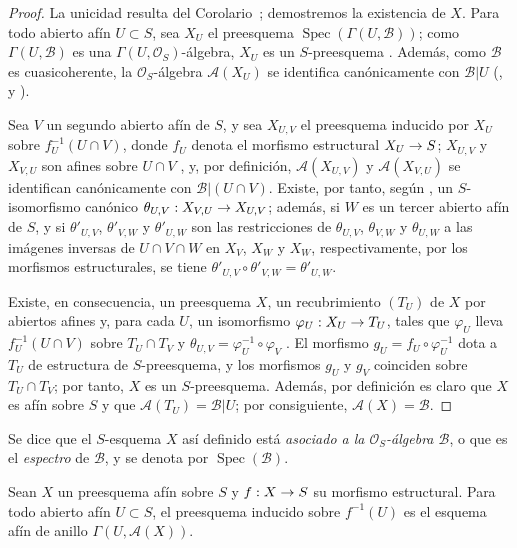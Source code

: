 \documentclass[oneside,10pt]{amsart}
\makeatletter
\newcommand{\ega@arrow}[2]{\mathchoice{#1}{#2}{#2}{#2}}
\renewcommand{\to}{\ega@arrow{\longrightarrow}{\rightarrow}}
\let\EGAOriginalLabel\label
\renewcommand{\label}[1]{\phantomsection\EGAOriginalLabel{#1}}
\makeatother
\begin{document}
\begin{proof}
La unicidad resulta del Corolario~; demostremos la existencia de $X$.
Para todo abierto afín $U\subset S$, sea $X_U$ el preesquema $\operatorname{Spec}(\Gamma(U,\mathcal{B}))$; como $\Gamma(U,\mathcal{B})$ es una $\Gamma(U,\mathcal{O}_S)$-álgebra, $X_U$ es un $S$-preesquema .
Además, como $\mathcal{B}$ es cuasicoherente, la $\mathcal{O}_S$-álgebra $\mathcal{A}(X_U)$ se identifica canónicamente con $\mathcal{B}|U$ (,  y ).

Sea $V$ un segundo abierto afín de $S$, y sea $X_{U,V}$ el preesquema inducido por $X_U$ sobre $f_U^{-1}(U\cap V)$, donde $f_U$ denota el morfismo estructural $X_U\to S$; $X_{U,V}$ y $X_{V,U}$ son afines sobre $U\cap V$ , y, por definición, $\mathcal{A}(X_{U,V})$ y $\mathcal{A}(X_{V,U})$ se identifican canónicamente con $\mathcal{B}|(U\cap V)$.
Existe, por tanto, según , un $S$-isomorfismo canónico $\theta_{U,V}:X_{V,U}\to X_{U,V}$; además, si $W$ es un tercer abierto afín de $S$, y si $\theta'_{U,V}$, $\theta'_{V,W}$ y $\theta'_{U,W}$ son las restricciones de $\theta_{U,V}$, $\theta_{V,W}$ y $\theta_{U,W}$ a las imágenes inversas de $U\cap V\cap W$ en $X_V$, $X_W$ y $X_W$, respectivamente, por los morfismos estructurales, se tiene
$\theta'_{U,V}\circ\theta'_{V,W}=\theta'_{U,W}$.

Existe, en consecuencia, un preesquema $X$, un recubrimiento $(T_U)$ de $X$ por abiertos afines y, para cada $U$, un isomorfismo $\varphi_U:X_U\to T_U$, tales que $\varphi_U$ lleva $f_U^{-1}(U\cap V)$ sobre $T_U\cap T_V$ y
$\theta_{U,V}=\varphi_U^{-1}\circ\varphi_V$
.
El morfismo $g_U=f_U\circ\varphi_U^{-1}$ dota a $T_U$ de estructura de $S$-preesquema, y los morfismos $g_U$ y $g_V$ coinciden sobre $T_U\cap T_V$; por tanto, $X$ es un $S$-preesquema.
Además, por definición es claro que $X$ es afín sobre $S$ y que $\mathcal{A}(T_U)=\mathcal{B}|U$; por consiguiente, $\mathcal{A}(X)=\mathcal{B}$.
\end{proof}

Se dice que el $S$-esquema $X$ así definido está \emph{asociado a la $\mathcal{O}_S$-álgebra $\mathcal{B}$}, o que es el \emph{espectro} de $\mathcal{B}$, y se denota por $\operatorname{Spec}(\mathcal{B})$.

\begin{corollary}[1.3.2]
\label{II.1.3.2-fr}
Sean $X$ un preesquema afín sobre $S$ y $f:X\to S$ su morfismo estructural.
Para todo abierto afín $U\subset S$, el preesquema inducido sobre $f^{-1}(U)$ es el esquema afín de anillo $\Gamma(U,\mathcal{A}(X))$.
\end{corollary}
\end{document}
